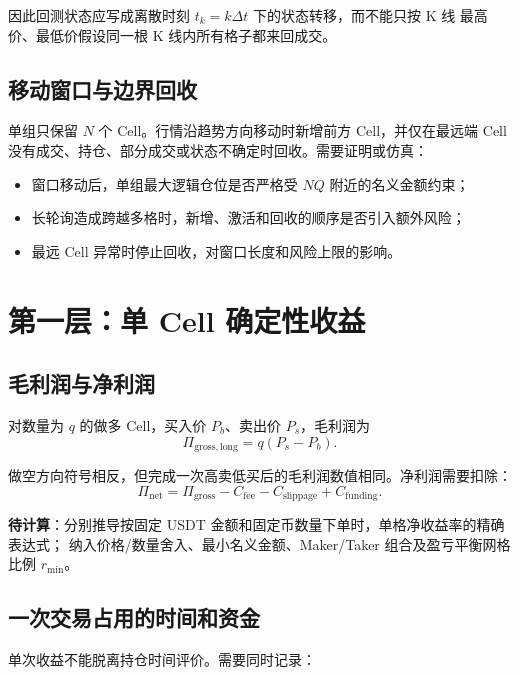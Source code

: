 \documentclass[11pt,a4paper,fontset=none]{ctexart}
\newcommand{\todoitem}{\textcolor{ResearchGold}{\textbf{待计算}}}
\begin{document}
因此回测状态应写成离散时刻 $t_k=k\Delta t$ 下的状态转移，而不能只按 K 线
最高价、最低价假设同一根 K 线内所有格子都来回成交。

\subsection{移动窗口与边界回收}

单组只保留 $N$ 个 Cell。行情沿趋势方向移动时新增前方 Cell，并仅在最远端 Cell
没有成交、持仓、部分成交或状态不确定时回收。需要证明或仿真：

\begin{itemize}
  \item 窗口移动后，单组最大逻辑仓位是否严格受 $NQ$ 附近的名义金额约束；
  \item 长轮询造成跨越多格时，新增、激活和回收的顺序是否引入额外风险；
  \item 最远 Cell 异常时停止回收，对窗口长度和风险上限的影响。
\end{itemize}

\section{第一层：单 Cell 确定性收益}

\subsection{毛利润与净利润}

对数量为 $q$ 的做多 Cell，买入价 $P_b$、卖出价 $P_s$，毛利润为
\begin{equation}
  \Pi_{\mathrm{gross,long}}=q(P_s-P_b).
\end{equation}

做空方向符号相反，但完成一次高卖低买后的毛利润数值相同。净利润需要扣除：
\begin{equation}
  \Pi_{\mathrm{net}}
  =\Pi_{\mathrm{gross}}-C_{\mathrm{fee}}-C_{\mathrm{slippage}}
  +C_{\mathrm{funding}}.
\end{equation}

\todoitem：分别推导按固定 USDT 金额和固定币数量下单时，单格净收益率的精确表达式；
纳入价格/数量舍入、最小名义金额、Maker/Taker 组合及盈亏平衡网格比例 $r_{\min}$。

\subsection{一次交易占用的时间和资金}

单次收益不能脱离持仓时间评价。需要同时记录：
\end{document}
